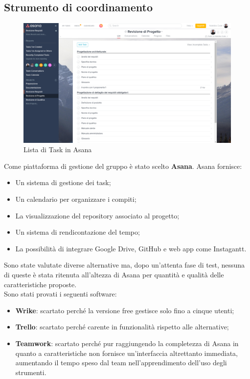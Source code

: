 \documentclass[../NormeDiProgetto.tex]{subfiles}
\begin{document}
		\subsection{Strumento di coordinamento}
			\begin{figure} [h!]
				\centering
				\includegraphics[scale=0.2]{./Immagini/Asana.png}
				\caption{Lista di Task in Asana}\label{}
			\end{figure}
			Come piattaforma di gestione del gruppo è stato scelto \textbf{Asana}. Asana fornisce:
			\begin{itemize}
				\item Un sistema di gestione dei task;
				\item Un calendario per organizzare i compiti;
				\item La visualizzazione del repository associato al progetto;
				\item Un sistema di rendicontazione del tempo;
				\item La possibilità di integrare Google Drive, GitHub e web app come Instagantt.
			\end{itemize}
			Sono state valutate diverse alternative ma, dopo un'attenta fase di test, nessuna di queste è
			stata ritenuta all'altezza di Asana per quantità e qualità delle caratteristiche proposte.\\
			Sono stati provati i seguenti software:
			\begin{itemize}
				\item \textbf{Wrike}: scartato perché la versione free gestisce solo fino a cinque utenti;
				\item \textbf{Trello}: scartato perché carente in funzionalità rispetto alle alternative;  
				\item \textbf{Teamwork}: scartato perché pur raggiungendo la completezza di Asana in quanto
				a caratteristiche non fornisce un'interfaccia altrettanto immediata, aumentando il tempo
				speso dal team nell'apprendimento dell'uso degli strumenti.
			\end{itemize}
\end{document}
